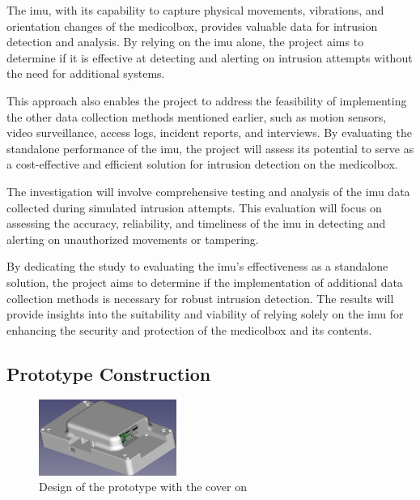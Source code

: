 \documentclass[../main.tex]{subfiles}
\begin{document}
    The \gls{imu}, with its capability to capture physical movements,
    vibrations, and orientation changes of the \gls{medicolbox},
    provides valuable data for \gls{intrusion} detection and analysis.
    By relying on the \gls{imu} alone, the project aims to determine if
    it is effective at detecting and alerting on \gls{intrusion} attempts without the
    need for additional systems.

    This approach also enables the project to address the feasibility of
    implementing the other data collection methods mentioned earlier,
    such as motion sensors, video surveillance, access logs,
    incident reports, and interviews.
    By evaluating the standalone performance of the \gls{imu},
    the project will assess its potential to serve as a cost-effective and
    efficient solution for \gls{intrusion} detection on the \gls{medicolbox}.

    The investigation will involve comprehensive testing and analysis of the
    \gls{imu} data collected during simulated \gls{intrusion} attempts.
    This evaluation will focus on assessing the accuracy, reliability,
    and timeliness of the \gls{imu} in detecting and
    alerting on unauthorized movements or tampering.

    By dedicating the study to evaluating the
    \gls{imu}'s effectiveness as a standalone solution,
    the project aims to determine if the implementation of
    additional data collection methods is
    necessary for robust \gls{intrusion} detection.
    The results will provide insights into the suitability and
    viability of relying solely on the \gls{imu} for enhancing the
    security and protection of the \gls{medicolbox} and its contents.

    \subsection{Prototype Construction}
    \begin{figure}[htbp]
        \centering
        \includegraphics[width=0.4\textwidth]
        {resources/images/rpi_with_cover.png}
        \caption{Design of the prototype with the cover on}
        \label{fig:prototype_graphics_with_cover}
    \end{figure}
\end{document}
